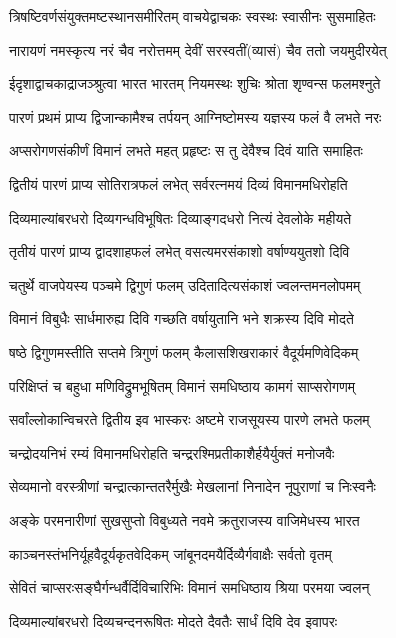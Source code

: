 \twolineshloka
{त्रिषष्टिवर्णसंयुक्तमष्टस्थानसमीरितम्}
{वाचयेद्वाचकः स्वस्थः स्वासीनः सुसमाहितः}


\twolineshloka
{नारायणं नमस्कृत्य नरं चैव नरोत्तमम्}
{देवीं सरस्वतीं(व्यासं) चैव ततो जयमुदीरयेत्}


\twolineshloka
{ईदृशाद्वाचकाद्राजञ्श्रुत्वा भारत भारतम्}
{नियमस्थः शुचिः श्रोता शृण्वन्स फलमश्नुते}


\twolineshloka
{पारणं प्रथमं प्राप्य द्विजान्कामैश्च तर्पयन्}
{आग्निष्टोमस्य यज्ञस्य फलं वै लभते नरः}


\twolineshloka
{अप्सरोगणसंकीर्णं विमानं लभते महत्}
{प्रहृष्टः स तु देवैश्च दिवं याति समाहितः}


\twolineshloka
{द्वितीयं पारणं प्राप्य सोतिरात्रफलं लभेत्}
{सर्वरत्नमयं दिव्यं विमानमधिरोहति}


\twolineshloka
{दिव्यमाल्यांबरधरो दिव्यगन्धविभूषितः}
{दिव्याङ्गदधरो नित्यं देवलोके महीयते}


\twolineshloka
{तृतीयं पारणं प्राप्य द्वादशाहफलं लभेत्}
{वसत्यमरसंकाशो वर्षाण्ययुतशो दिवि}


\twolineshloka
{चतुर्थे वाजपेयस्य पञ्चमे द्विगुणं फलम्}
{उदितादित्यसंकाशं ज्वलन्तमनलोपमम्}


\twolineshloka
{विमानं विबुधैः सार्धमारुह्य दिवि गच्छति}
{वर्षायुतानि भने शक्रस्य दिवि मोदते}


\twolineshloka
{षष्ठे द्विगुणमस्तीति सप्तमे त्रिगुणं फलम्}
{कैलासशिखराकारं वैदूर्यमणिवेदिकम्}


\twolineshloka
{परिक्षिप्तं च बहुधा मणिविद्रुमभूषितम्}
{विमानं समधिष्ठाय कामगं साप्सरोगणम्}


\twolineshloka
{सर्वांल्लोकान्विचरते द्वितीय इव भास्करः}
{अष्टमे राजसूयस्य पारणे लभते फलम्}


\twolineshloka
{चन्द्रोदयनिभं रम्यं विमानमधिरोहति}
{चन्द्ररश्मिप्रतीकाशैर्हयैर्युक्तं मनोजवैः}


\twolineshloka
{सेव्यमानो वरस्त्रीणां चन्द्रात्कान्ततरैर्मुखैः}
{मेखलानां निनादेन नूपुराणां च निःस्वनैः}


\twolineshloka
{अङ्के परमनारीणां सुखसुप्तो विबुध्यते}
{नवमे क्रतुराजस्य वाजिमेधस्य भारत}


\twolineshloka
{काञ्चनस्तंभनिर्यूहवैदूर्यकृतवेदिकम्}
{जांबूनदमयैर्दिव्यैर्गवाक्षैः सर्वतो वृतम्}


\twolineshloka
{सेवितं चाप्सरःसङ्घैर्गन्धर्वैर्दिविचारिभिः}
{विमानं समधिष्ठाय श्रिया परमया ज्वलन्}


\twolineshloka
{दिव्यमाल्यांबरधरो दिव्यचन्दनरूषितः}
{मोदते दैवतैः सार्धं दिवि देव इवापरः}


